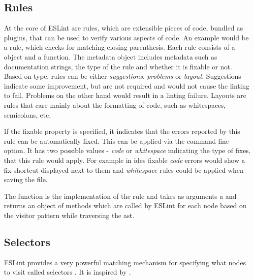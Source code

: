 \subsection{Rules}
At the core of ESLint are rules, which are extensible pieces of code, bundled as plugins, that can be used to verify various aspects of code. An example would be a rule, which checks for matching closing parenthesis. 
Each rule consists of a  object
and a  function. The metadata object includes metadata such as documentation strings, the type of the rule and whether it is fixable or not. Based on type, rules can be either \textit{suggestions}, \textit{problems} or \textit{layout}. Suggestions indicate some improvement, but are not required and would not cause the linting to fail. Problems on the other hand would result in a linting failure. Layouts are rules that care mainly about the formatting of code, such as whitespaces, semicolons, etc. 

If the fixable property is specified, it indicates that the errors reported by this rule can be automatically fixed. This can be applied via the  command line option. It has two possible values - \textit{code} or \textit{whitespace} indicating the type of fixes, that this rule would apply. For example in \glspl{ide} fixable \textit{code} errors would show a fix shortcut displayed next to them and \textit{whitespace} rules could be applied when saving the file.

The  function is the implementation of the rule and takes as arguments a  and returns an object of methods which are called by ESLint for each node based on the \gls{visitor} pattern while traversing the \gls{ast}. 

\subsection{Selectors}
ESLint provides a very powerful matching mechanism for specifying what nodes to visit called selectors \parencite{eslintSelectors}. It is inspired by \textcite{estoolsEsQuery}.

